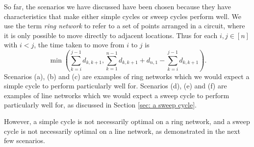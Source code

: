 \documentclass[11pt,a4paper]{article}
\begin{document}
So far, the scenarios we have discussed have been chosen because they have characteristics that make either simple cycles or sweep cycles perform well.
We use the term \emph{ring network} to refer to a set of points arranged in a circuit, where it is only possible to move directly to adjacent locations.
Thus for each $i, j \in [n]$ with $i < j$, the time taken to move from $i$ to $j$ is
$$ \min \left( \sum_{k=i}^{j-1} d_{k,k+1}, \sum_{k=1}^{n-1} d_{k,k+1} + d_{n,1} - \sum_{k=i}^{j-1} d_{k,k+1} \right). $$ 
Scenarios (a), (b) and (c) are examples of ring networks which we would expect a simple cycle to perform particularly well for.
Scenarios (d), (e) and (f) are examples of line networks which we would expect a sweep cycle to perform particularly well for, as discussed in Section \ref{sec: a sweep cycle}.

However, a simple cycle is not necessarily optimal on a ring network, and a sweep cycle is not necessarily optimal on a line network, as demonstrated in the next few scenarios. 
\end{document}
